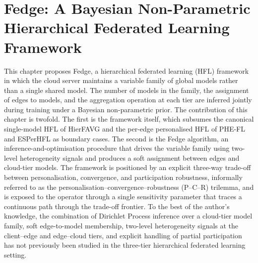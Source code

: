 %
%
%

\chapter{Fedge: A Bayesian Non-Parametric Hierarchical Federated Learning Framework}
\label{ch:fedge}

This chapter proposes Fedge, a hierarchical federated learning (HFL) framework in which the cloud server maintains a variable family of global models rather than a single shared model. The number of models in the family, the assignment of edges to models, and the aggregation operation at each tier are inferred jointly during training under a Bayesian non-parametric prior. The contribution of this chapter is twofold. The first is the framework itself, which subsumes the canonical single-model HFL of HierFAVG \cite{liu2020hierfavg} and the per-edge personalised HFL of PHE-FL \cite{lee2025phefl} and ESPerHFL \cite{ma2024personalized} as boundary cases. The second is the Fedge algorithm, an inference-and-optimisation procedure that drives the variable family using two-level heterogeneity signals and produces a soft assignment between edges and cloud-tier models. The framework is positioned by an explicit three-way trade-off between personalisation, convergence, and participation robustness, informally referred to as the personalisation--convergence--robustness (P--C--R) trilemma, and is exposed to the operator through a single sensitivity parameter that traces a continuous path through the trade-off frontier. To the best of the author's knowledge, the combination of Dirichlet Process inference over a cloud-tier model family, soft edge-to-model membership, two-level heterogeneity signals at the client--edge and edge--cloud tiers, and explicit handling of partial participation has not previously been studied in the three-tier hierarchical federated learning setting.

